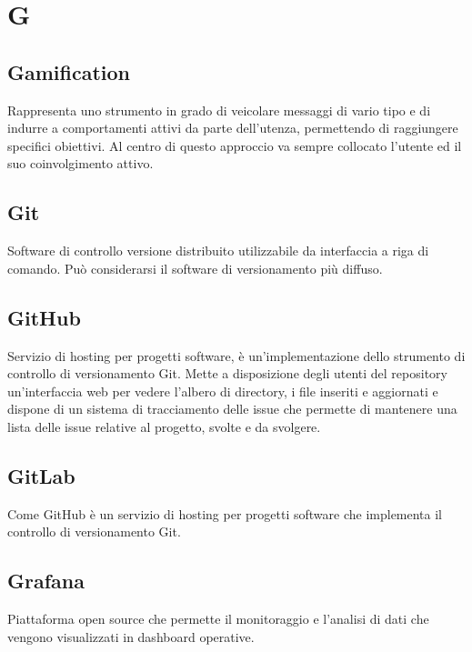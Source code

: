 \section*{G}

\subsection{Gamification}
Rappresenta uno strumento in grado di veicolare messaggi di vario tipo e di indurre a comportamenti attivi da parte dell’utenza, permettendo di raggiungere specifici obiettivi. Al centro di questo approccio va sempre collocato l'utente ed il suo coinvolgimento attivo.

\subsection{Git}
Software di controllo versione distribuito utilizzabile da interfaccia a riga di comando. Può considerarsi il software di versionamento più diffuso.

\subsection{GitHub}
Servizio di hosting per progetti software, è un'implementazione dello strumento di controllo di versionamento Git. Mette a disposizione degli utenti del repository un'interfaccia web per vedere l'albero di directory, i file inseriti e aggiornati e dispone di un sistema di tracciamento delle issue che permette di mantenere una lista delle issue relative al progetto, svolte e da svolgere.

\subsection{GitLab}
Come GitHub è un servizio di hosting per progetti software che implementa il controllo di versionamento Git. 

\subsection{Grafana}
Piattaforma open source che permette il monitoraggio e l'analisi di dati che vengono visualizzati in dashboard operative. 